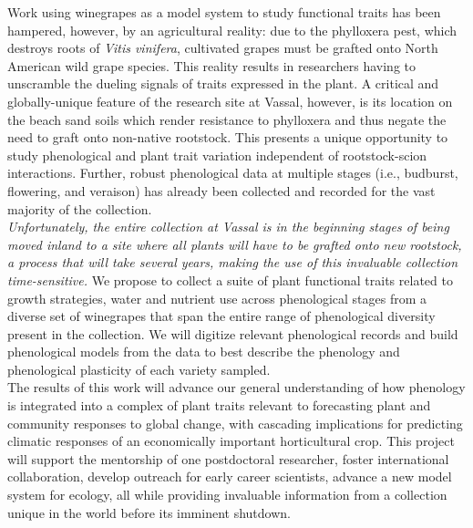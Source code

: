 \documentclass[10pt,letter,oneside]{article}
\begin{document}
Work using winegrapes as a model system to study functional traits has been hampered, however, by an agricultural reality: due to the phylloxera pest, which destroys roots of \emph{Vitis vinifera}, cultivated grapes must be grafted onto North American wild grape species. This reality results in researchers having to unscramble the dueling signals of traits expressed in the plant. A critical and globally-unique feature of the research site at Vassal, however, is its location on the beach sand soils which render resistance to phylloxera and thus negate the need to graft onto non-native rootstock. This presents a unique opportunity to study phenological and plant trait variation independent of rootstock-scion interactions. Further, robust phenological data at multiple stages (i.e., budburst, flowering, and veraison) has already been collected and recorded for the vast majority of the collection. \\

\emph{Unfortunately, the entire collection at Vassal is in the beginning stages of being moved inland to a site where all plants will have to be grafted onto new rootstock, a process that will take several years, making the use of this invaluable collection time-sensitive.} We propose to collect a suite of plant functional traits related to growth strategies, water and nutrient use across phenological stages from a diverse set of winegrapes that span the entire range of phenological diversity present in the collection. We will digitize relevant phenological records and build phenological models from the data to best describe the phenology and phenological plasticity of each variety sampled. \\

The results of this work will advance our general understanding of how phenology is integrated into a complex of plant traits relevant to forecasting  plant and community responses to global change, with cascading implications for predicting climatic responses of an economically important horticultural crop. This project will support the mentorship of one postdoctoral researcher, foster international collaboration, develop outreach for early career scientists, advance a new model system for ecology, all while providing invaluable information from a collection unique in the world before its imminent shutdown.\\ 
\end{document}
